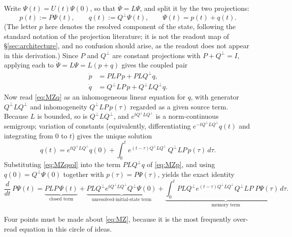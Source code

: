 \documentclass[11pt,reqno]{amsart}
\theoremstyle{plain}
\theoremstyle{definition}
\theoremstyle{remark}
\begin{document}
Write $\Psi(t)=U(t)\Psi(0)$, so that $\dot\Psi=L\Psi$, and split it by the two projections:
\[
p(t):=P\Psi(t),\qquad q(t):=Q^{\!\perp}\Psi(t),\qquad \Psi(t)=p(t)+q(t).
\]
(The letter $p$ here denotes the resolved component of the state, following the standard notation of the projection literature; it is not the readout map of \S\ref{sec:architecture}, and no confusion should arise, as the readout does not appear in this derivation.) Since $P$ and $Q^{\!\perp}$ are constant projections with $P+Q^{\!\perp}=I$, applying each to $\dot\Psi=L\Psi=L(p+q)$ gives the coupled pair
\begin{align}
\dot p&=P L P\,p+P L Q^{\!\perp} q, \label{eq:MZp}\\
\dot q&=Q^{\!\perp} L P\,p+Q^{\!\perp} L Q^{\!\perp} q. \label{eq:MZq}
\end{align}
Now read \eqref{eq:MZq} as an inhomogeneous linear equation for $q$, with generator $Q^{\!\perp}LQ^{\!\perp}$ and inhomogeneity $Q^{\!\perp}LP\,p(\tau)$ regarded as a given source term. Because $L$ is bounded, so is $Q^{\!\perp}LQ^{\!\perp}$, and $e^{tQ^{\!\perp}LQ^{\!\perp}}$ is a norm-continuous semigroup; variation of constants (equivalently, differentiating $e^{-tQ^{\!\perp}LQ^{\!\perp}}q(t)$ and integrating from $0$ to $t$) gives the unique solution
\begin{equation}\label{eq:MZqsol}
q(t)=e^{tQ^{\!\perp} L Q^{\!\perp}}q(0)
+\int_0^t e^{(t-\tau)Q^{\!\perp} L Q^{\!\perp}}\,Q^{\!\perp} L P\,p(\tau)\,d\tau .
\end{equation}
Substituting \eqref{eq:MZqsol} into the term $PLQ^{\!\perp}q$ of \eqref{eq:MZp}, and using $q(0)=Q^{\!\perp}\Psi(0)$ together with $p(\tau)=P\Psi(\tau)$, yields the exact identity
\begin{equation}\label{eq:MZ}
\frac{d}{dt}\,P\Psi(t)
= \underbrace{P L P\,\Psi(t)}_{\text{closed term}}
+ \underbrace{P L Q^{\!\perp} e^{tQ^{\!\perp} L Q^{\!\perp}} Q^{\!\perp}\Psi(0)}_{\text{unresolved-initial-state term}}
+ \underbrace{\int_0^t P L Q^{\!\perp} e^{(t-\tau)Q^{\!\perp} L Q^{\!\perp}} Q^{\!\perp} L P\;P\Psi(\tau)\,d\tau}_{\text{memory term}} .
\end{equation}

Four points must be made about \eqref{eq:MZ}, because it is the most frequently over-read equation in this circle of ideas.
\end{document}
